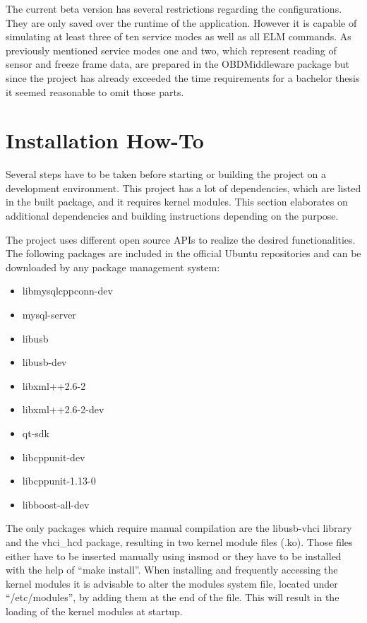The current beta version has several restrictions regarding the configurations. They are only saved over the runtime of the application. 
However it is capable of simulating at least three of ten service modes as well as all ELM commands.
As previously mentioned service modes one and two, which represent reading of sensor and freeze frame data, are prepared in the OBDMiddleware package
but since the project has already exceeded the time requirements for a bachelor thesis it seemed reasonable to omit those parts.

\section{Installation How-To}

Several steps have to be taken before starting or building the project on a development environment.
This project has a lot of dependencies, which are listed in the built package, and it requires kernel modules.
This section elaborates on additional dependencies and building instructions depending on the purpose.

The project uses different open source APIs to realize the desired functionalities.
The following packages are included in the official Ubuntu repositories and can be downloaded by any package management system:

\begin{itemize}
 \item libmysqlcppconn-dev 
 \item mysql-server
 \item libusb 
 \item libusb-dev
 \item libxml++2.6-2 
 \item libxml++2.6-2-dev 
 \item qt-sdk
 \item libcppunit-dev 
 \item libcppunit-1.13-0 
 \item libboost-all-dev 
\end{itemize}

The only packages which require manual compilation are the libusb-vhci library and the vhci\_hcd package, 
resulting in two kernel module files (.ko). Those files either have to be inserted manually using insmod 
or they have to be installed with the help of ``make install''. When installing and frequently accessing the 
kernel modules it is advisable to alter the modules system file, located under “/etc/modules”, by adding 
them at the end of the file. This will result in the loading of the kernel modules at startup.

